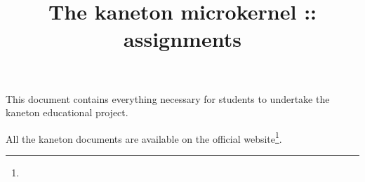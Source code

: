 %
%
%
%
%
%

%
%

%
%

\def\path{../..}

%
%



%
%


%
%

\title{The kaneton microkernel :: assignments \\
       \version
       \logo}

%
%



%
%

\maketitle

%
%

This document contains everything necessary for students to undertake the
kaneton educational project.

\-

All the kaneton documents are available on
  the official website\footnote{}.

%
%

\tableofcontents

%
%

\indentation{}

%
%









%




